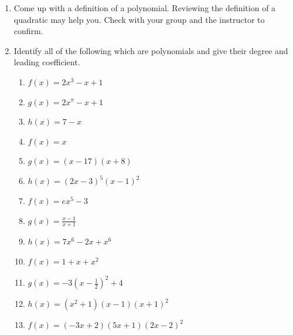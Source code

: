 \documentclass[noauthor]{ximera}
\begin{document}
\begin{enumerate}
    \item Come up with a definition of a polynomial. Reviewing the
    definition of a quadratic may help you. Check with your group
    and the instructor to confirm.
    \item Identify all of the following which are polynomials 
    and give their degree and leading coefficient.
    \begin{enumerate}
        \item \(f\left(x\right)=2x^3-x+1\)
	    \item \(g\left(x\right)=2x^\pi-x+1\)
	    \item \(h\left(x\right)=7-x\)
	    \item \(f\left(x\right)=x\)
	    \item \(g\left(x\right)=\left(x-17\right)\left(x+8\right)\)
	    \item \(h\left(x\right)=\left(2x-3\right)^5\left(x-1\right)^2\)
	    \item \(f\left(x\right)= e x^5-3\)
	    \item \(g\left(x\right)=\frac{x-1}{x+1}\)
	    \item \(h\left(x\right)=7x^6-2x+x^6\)
	    \item \(f\left(x\right)=1+x+x^2\)
	    \item \(g\left(x\right)=-3\left(x-\frac{1}{2}\right)^2+4\)
	    \item \(h\left(x\right)=\left(x^2+1\right)\left(x-1\right)\left(x+1\right)^2\)
	    \item \(f\left(x\right)=\left(-3x+2\right)\left(5x+1\right)\left(2x-2\right)^2\) 
    \end{enumerate}
\end{enumerate}
\end{document}
